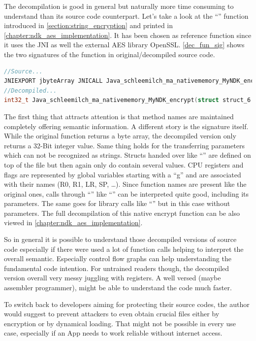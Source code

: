 The decompilation is good in general but naturally more time
consuming to understand than its source code counterpart.
Let's take a look at the ``'' function
introduced in \autoref{section:string_encryption} and printed
in \autoref{chapter:ndk_aes_implementation}.
It has been chosen as reference function since it uses the
JNI as well the external AES library OpenSSL.
\autoref{dec_fun_sig} shows the two signatures of the function
in original/decompiled source code.
\begin{lstlisting}[language=C++, caption=Original vs Decompiled JNI Method Signatures, label=dec_fun_sig]
//Source...
JNIEXPORT jbyteArray JNICALL Java_schleemilch_ma_nativememory_MyNDK_encrypt (JNIEnv *env, jobject obj, jstring str, jstring jkey);
//Decompiled...
int32_t Java_schleemilch_ma_nativememory_MyNDK_encrypt(struct struct_6 a1, int32_t a2, int32_t a3, int32_t a4, int32_t a5, int32_t a6, int32_t a7, int32_t a8, int32_t a9, int32_t a10, int32_t a11);
\end{lstlisting}
The first thing that attracts attention is that method names are maintained
completely offering semantic information. A different story is the
signature itself. While the original function returns a byte array,
the decompiled version only returns a 32-Bit integer value. Same thing
holds for the transferring parameters which can not be recognized as
strings. Structs handed over like ``'' are defined
on top of the file but then again only do contain several
 values. CPU registers and flags are represented
by global variables starting with a ``g'' and are associated
with their names (R0, R1, LR, SP, \ldots).
Since function names are present like the original ones,
calls through ``'' like ``'' can be interpreted quite good,
including its parameters.
The same goes for library calls like ``''
but in this case without parameters.
The full decompilation of this native encrypt function can be
also viewed in \autoref{chapter:ndk_aes_implementation}.

So in general it is possible to understand those decompiled versions
of source code especially if there were used a lot of function
calls helping to interpret the overall semantic. Especially
control flow graphs can help understanding the fundamental code intention.
For untrained readers though, the decompiled version overall very messy
juggling with registers. A well versed (maybe assembler programmer),
might be able to understand the code much faster.

To switch back to developers aiming for protecting their source codes,
the author would suggest to prevent attackers to even
obtain crucial files either by encryption or by dynamical loading.
That might not be possible in every use case, especially if an App
needs to work reliable without internet access.
